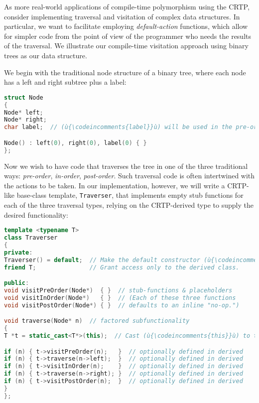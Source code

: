 As more real-world applications of compile-time polymorphism using the CRTP,
consider implementing traversal and visitation of complex data
structures. In particular, we want to facilitate employing
\emph{default-action} functions, which allow for simpler code from the
point of view of the programmer who needs the results of the traversal.
We illustrate our compile-time visitation approach using binary trees as
our data structure.

We begin with the traditional node structure of a binary tree, where
each node has a left and right subtree plus a label:

\begin{lstlisting}[language=C++]
struct Node
{
Node* left;
Node* right;
char label;  // (ù{\codeincomments{label}}ù) will be used in the pre-order example.

Node() : left(0), right(0), label(0) { }
};
\end{lstlisting}

\noindent Now we wish to have code that traverses the tree in one of the three
traditional ways: \emph{pre-order}, \emph{in-order}, \emph{post-order}.
Such traversal code is often intertwined with the actions to be taken.
In our implementation, however, we will write a CRTP-like base-class
template, \texttt{Traverser}, that implements empty stub functions for
each of the three traversal types, relying on the CRTP-derived
type to supply the desired functionality:

\begin{lstlisting}[language=C++]
template <typename T>
class Traverser
{
private:
Traverser() = default;  // Make the default constructor (ù{\codeincomments{private}}ù).
friend T;               // Grant access only to the derived class.

public:
void visitPreOrder(Node*)  { }  // stub-functions & placeholders
void visitInOrder(Node*)   { }  // (Each of these three functions
void visitPostOrder(Node*) { }  // defaults to an inline "no-op.")

void traverse(Node* n)  // factored subfunctionality
{
T *t = static_cast<T*>(this);  // Cast (ù{\codeincomments{this}}ù) to the derived type.

if (n) { t->visitPreOrder(n);   }  // optionally defined in derived
if (n) { t->traverse(n->left);  }  // optionally defined in derived
if (n) { t->visitInOrder(n);    }  // optionally defined in derived
if (n) { t->traverse(n->right); }  // optionally defined in derived
if (n) { t->visitPostOrder(n);  }  // optionally defined in derived
}
};
\end{lstlisting}

